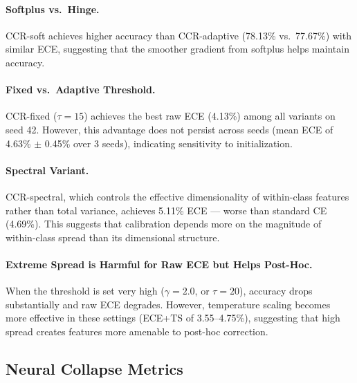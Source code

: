 \documentclass{article}
\begin{document}
\paragraph{Softplus vs.\ Hinge.} CCR-soft achieves higher accuracy than CCR-adaptive (78.13\% vs.\ 77.67\%) with similar ECE, suggesting that the smoother gradient from softplus helps maintain accuracy.

\paragraph{Fixed vs.\ Adaptive Threshold.} CCR-fixed ($\tau = 15$) achieves the best raw ECE (4.13\%) among all variants on seed 42. However, this advantage does not persist across seeds (mean ECE of 4.63\% $\pm$ 0.45\% over 3 seeds), indicating sensitivity to initialization.

\paragraph{Spectral Variant.} CCR-spectral, which controls the effective dimensionality of within-class features rather than total variance, achieves 5.11\% ECE --- worse than standard CE (4.69\%). This suggests that calibration depends more on the magnitude of within-class spread than its dimensional structure.

\paragraph{Extreme Spread is Harmful for Raw ECE but Helps Post-Hoc.} When the threshold is set very high ($\gamma = 2.0$, or $\tau = 20$), accuracy drops substantially and raw ECE degrades. However, temperature scaling becomes more effective in these settings (ECE+TS of 3.55--4.75\%), suggesting that high spread creates features more amenable to post-hoc correction.

\subsection{Neural Collapse Metrics}
\end{document}
